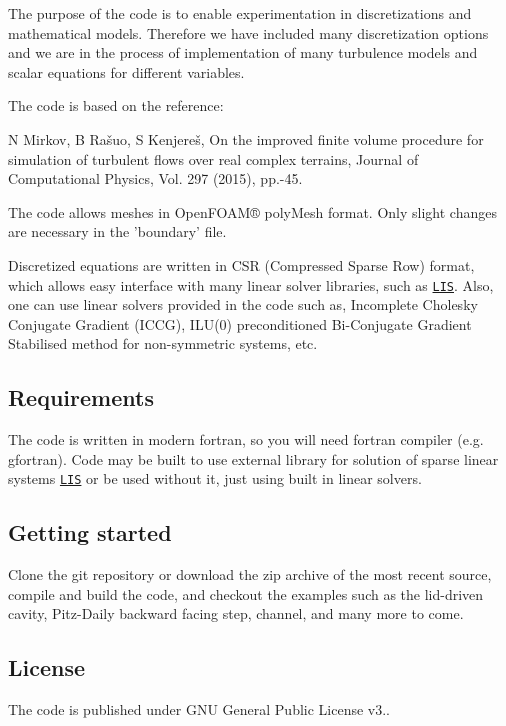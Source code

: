 The purpose of the code is to enable experimentation in discretizations and mathematical models. Therefore we have included many discretization options and we are in the process of implementation of many turbulence models and scalar equations for different variables.

The code is based on the reference\-:

N Mirkov, B Rašuo, S Kenjereš, On the improved finite volume procedure for simulation of turbulent flows over real complex terrains, Journal of Computational Physics, Vol. 297 (2015), pp.-\/45.

The code allows meshes in Open\-F\-O\-A\-M® poly\-Mesh format. Only slight changes are necessary in the 'boundary' file.

Discretized equations are written in C\-S\-R (Compressed Sparse Row) format, which allows easy interface with many linear solver libraries, such as \href{http://www.ssisc.org/lis/}{\tt L\-I\-S}. Also, one can use linear solvers provided in the code such as, Incomplete Cholesky Conjugate Gradient (I\-C\-C\-G), I\-L\-U(0) preconditioned Bi-\/\-Conjugate Gradient Stabilised method for non-\/symmetric systems, etc.

\subsection*{Requirements }

The code is written in modern fortran, so you will need fortran compiler (e.\-g. gfortran). Code may be built to use external library for solution of sparse linear systems \href{http://www.ssisc.org/lis/}{\tt L\-I\-S} or be used without it, just using built in linear solvers.

\subsection*{Getting started }

Clone the git repository or download the zip archive of the most recent source, compile and build the code, and checkout the examples such as the lid-\/driven cavity, Pitz-\/\-Daily backward facing step, channel, and many more to come. 

\subsection*{License }

The code is published under G\-N\-U General Public License v3.. 